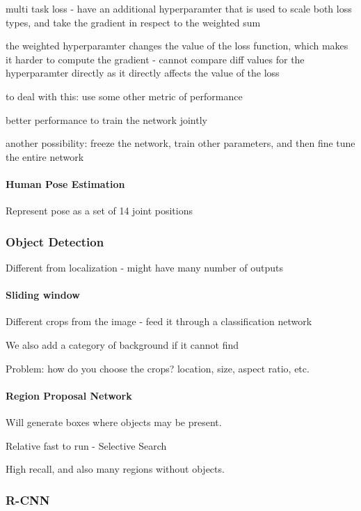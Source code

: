 multi task loss - have an additional hyperparamter that is used to scale both loss types, and take the gradient in respect to the weighted sum

the weighted hyperparamter changes the value of the loss function, which makes it harder to compute the gradient - cannot compare diff values for the hyperparamter directly as it directly affects the value of the loss

to deal with this: use some other metric of performance

better performance to train the network jointly

another possibility: freeze the network, train other parameters, and then fine tune the entire network

\paragraph{Human Pose Estimation}

Represent pose as a set of 14 joint positions

\subsubsection{Object Detection}

Different from localization - might have many number of outputs

\paragraph{Sliding window}

Different crops from the image - feed it through a classification network

We also add a category of background if it cannot find

Problem: how do you choose the crops? location, size, aspect ratio, etc.

\paragraph{Region Proposal Network}

Will generate boxes where objects may be present.

Relative fast to run - Selective Search

High recall, and also many regions without objects.

\subsubsection{R-CNN}

